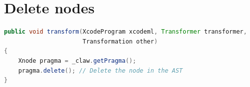 \documentclass[a4paper, 11pt]{report}
\newcommand{\emptypage}{}
\begin{document}
\section{Delete nodes}
\begin{lstlisting}[label=lst:delete_node, language=Java, caption=XcodeML/F delete node example]
public void transform(XcodeProgram xcodeml, Transformer transformer,
                      Transformation other)
{                      
    Xnode pragma = _claw.getPragma();
    pragma.delete(); // Delete the node in the AST
}
\end{lstlisting}


\pagebreak
\glsaddall
\printglossaries

\emptypage
\pagebreak
\listoffigures

\pagebreak
\listoftables

\emptypage
\pagebreak
\lstlistoflistings

 



%
\end{document}
